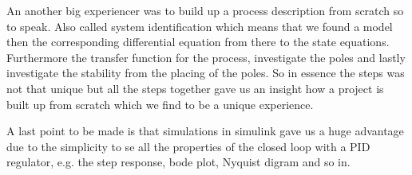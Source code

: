 \documentclass{article}
\begin{document}
An another big experiencer was to build up a process description from scratch so to speak. Also called system identification which means that we found a model then the corresponding differential equation from there to the state equations. Furthermore the transfer function for the process, investigate the poles and lastly investigate the stability from the placing of the poles. So in essence the steps was not that unique but all the steps together gave us an insight how a project is built up from scratch which we find to be a unique experience. 

A last point to be made is that simulations in simulink gave us a huge advantage due to the simplicity to se all the properties of the closed loop with a PID regulator, e.g. the step response, bode plot, Nyquist digram and so in. 
\end{document}
